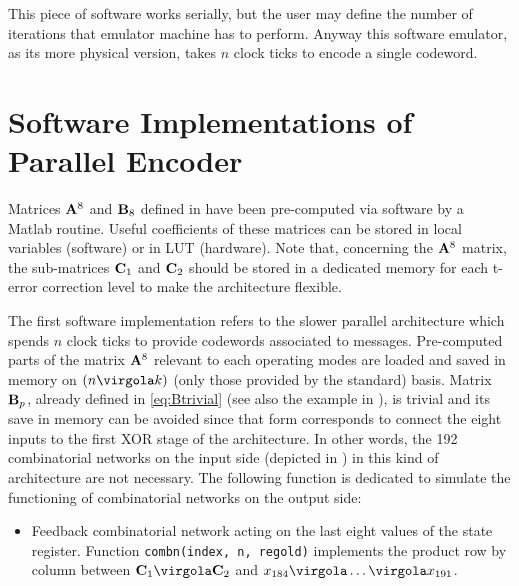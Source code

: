 
This piece of software works serially, but the user may define the number of iterations that emulator machine has to perform. Anyway this software emulator, as its more physical version, takes \(n\) clock ticks to encode a single codeword.

\section{Software Implementations of Parallel Encoder}

Matrices \(\mathbf{A}^8\) and \(\mathbf{B}_8\) defined in  have been pre-computed via software by a Matlab routine. Useful coefficients of these matrices can be stored in local variables (software) or in LUT (hardware). Note that, concerning the \(\mathbf{A}^8\) matrix, the sub-matrices \(\mathbf{C}_1\) and \(\mathbf{C}_2\) should be stored in a dedicated memory for each t-error correction level to make the architecture flexible.

The first software implementation refers to the slower parallel architecture which spends \(n\) clock ticks to provide codewords associated to messages. Pre-computed parts of the matrix \(\mathbf{A}^8\) relevant to each operating modes are loaded and saved in memory on \( (n \virgola k) \) (only those provided by the standard) basis. Matrix \(\mathbf{B}_p\), already defined in \eqref{eq:Btrivial} (see also the example in ), is trivial and its save in memory can be avoided since that form corresponds to connect the eight inputs to the first XOR stage of the architecture. In other words, the 192 combinatorial networks on the input side (depicted in ) in this kind of architecture are not necessary.
The following function is dedicated to simulate the functioning of combinatorial networks on the output side:
\begin{itemize}
\item Feedback combinatorial network acting on the last eight values of the state register. Function \texttt{combn(index, n, regold)} implements the product row by column between \(\vet C_1 \virgola \vet C_2\) and \(x_{184}\virgola \ldots \virgola x_{191}\).
\end{itemize}

